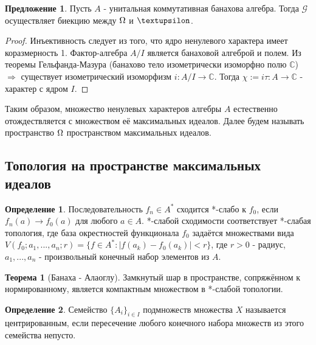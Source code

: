 \documentclass[12pt]{extarticle}
\theoremstyle{definition}
\newtheorem{theorem}{\indent Теорема}[section]
\newtheorem{definition}{\indent Определение}[section]
\newtheorem{suggestion}{\indent Предложение}[section]
\begin{document}
    \begin{suggestion}
    Пусть $A$ - унитальная коммутативная банахова алгебра. Тогда $\mathcal{G}$ осуществляет биекцию между $\ohm$ и $\textupsilon$.
    \end{suggestion} 
     \begin{proof}
     Инъективность следует из того, что ядро ненулевого характера имеет коразмерность 1. Фактор-алгебра $A/I$ является банаховой алгеброй и полем. Из теоремы Гельфанда-Мазура (банахово тело изометрически изоморфно полю $\mathds{C}$) $\Rightarrow$ существует изометрический изоморфизм $i: A/I \rightarrow \mathds{C}$. Тогда $\chi := i\tau : A \rightarrow \mathds{C}$ - характер с ядром $I$.
      \end{proof}
      
      Таким образом, множество ненулевых характеров алгебры $A$ естественно отождествляется с множеством её максимальных идеалов. Далее будем называть пространство $\ohm$ пространством максимальных идеалов.
      
      \subsection{Топология на пространстве максимальных идеалов}
      
      \begin{definition}
        Последовательность $f_n \in A^*$ сходится *-слабо к $f_0$, если $f_n(a) \rightarrow f_0(a)$ для любого $a \in A$. *-слабой сходимости соответствует *-слабая топология, где база окрестностей функционала $f_0$ задаётся множествами вида $V(f_0; a_1, ..., a_n; r) = \{f \in A^*: |f(a_k) - f_0(a_k)| < r\}$, где $r>0$ - радиус, $a_1, ..., a_n$ - произвольный конечный набор элементов из $A$.
    \end{definition}
    
    \begin{theorem}[Банаха - Алаоглу]
    Замкнутый шар в пространстве, сопряжённом к нормированному, является компактным множеством в *-слабой топологии.
    \end{theorem}
    
    \begin{definition}
    Семейство $\{A_i\}_{i \in I}$ подмножеств множества $X$ называется центрированным, если пересечение любого конечного набора множеств из этого семейства непусто.
    \end{definition}
    
\end{document}
